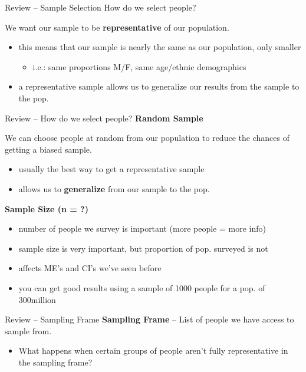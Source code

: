 \documentclass{beamer}
\begin{document}
\begin{frame}{Review -- Sample Selection}
How do we select people? \vspace{6mm}

We want our sample to be \textbf{representative} of our population.
\begin{itemize}
    \item this means that our sample is nearly the same as our population, only smaller
        \begin{itemize}
            \item i.e.: same proportions M/F, same age/ethnic demographics
        \end{itemize} \vspace{4mm}
    \item a representative sample allows us to generalize our results from the sample to the pop.
\end{itemize}
\end{frame}

\begin{frame}{Review -- How do we select people?}
\textbf{Random Sample}

We can choose people at random from our population to reduce the chances of getting a biased sample.
\begin{itemize}
    \item usually the best way to get a representative sample
    \item allows us to \textbf{generalize} from our sample to the pop.
\end{itemize} \vspace{8mm}

\textbf{Sample Size (n = ?)}
\begin{itemize}
    \item number of people we survey is important (more people = more info)
    \item sample size is very important, but proportion of pop. surveyed is not
    \item affects ME's and CI's we've seen before
    \item you can get good results using a sample of 1000 people for a pop. of 300million
\end{itemize}
\end{frame}

\begin{frame}{Review -- Sampling Frame}
\textbf{Sampling Frame} -- List of people we have access to sample from.
\begin{itemize}
    \item What happens when certain groups of people aren't fully representative in the sampling frame?
\end{itemize}
\end{frame}
\end{document}
